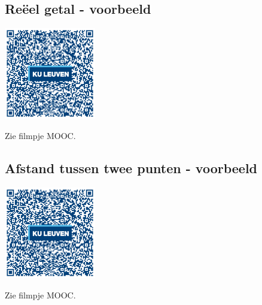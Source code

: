 

\subsection{Re\"eel getal - voorbeeld} 

\begin{minipage}{.25\linewidth}
	\raggedright
	\includegraphics[width=4cm]{4_opp_inhoud_an_meetk/inputs/QR_Code_REEELGETALVB_module4new}
\end{minipage}
\begin{minipage}{.7\linewidth}
	Zie filmpje MOOC.
\end{minipage}






\subsection{Afstand tussen twee punten - voorbeeld} 
\begin{minipage}{.25\linewidth}
	\raggedright
	\includegraphics[width=4cm]{4_opp_inhoud_an_meetk/inputs/QR_Code_AFSTANDTWEEPTNVB_module4new}
\end{minipage}
\begin{minipage}{.7\linewidth}
	Zie filmpje MOOC.
\end{minipage}





